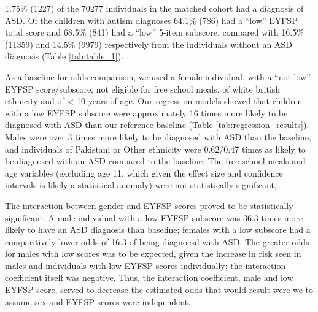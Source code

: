 
1.75\% (1227) of the 70277 individuals in the matched cohort had a diagnosis of ASD. Of the children with autism diagnoses 64.1\% (786) had a ``low'' EYFSP total score and 68.5\% (841) had a ``low'' 5-item subscore, compared with 16.5\% (11359) and 14.5\% (9979) respectively from the individuals without an ASD diagnosis (Table \ref{tab:table_1}).

As a baseline for odds comparison, we used a female individual, with a ``not low'' EYFSP score/subscore, not eligible for free school meals, of white british ethnicity and of < 10 years of age. Our regression models showed that children with a low EYFSP subscore were approximately 16 times more likely to be diagnosed with ASD than our reference baseline (Table \ref{tab:regression_results}). Males were over 3 times more likely to be diagnosed with ASD than the baseline, and individuals of Pakistani or Other ethnicity were 0.62/0.47 times as likely to be diagnosed with an ASD compared to the baseline. The free school meals and age variables (excluding age 11, which given the effect size and confidence intervals is likely a statistical anomaly) were not statistically significant, .

The interaction between gender and EYFSP scores proved to be statistically significant. A male individual with a low EYFSP subscore was 36.3 times more likely to have an ASD diagnosis than baseline; females with a low subscore had a comparitively lower odds of 16.3 of being diagnoesd with ASD. The greater odds for males with low scores was to be expected, given the increase in risk seen in males and individuals with low EYFSP scores individually; the interaction coefficient itself was negative. Thus, the interaction coefficient, male and low EYFSP score, served to decrease the estimated odds that would result were we to assume sex and EYFSP scores were independent.

